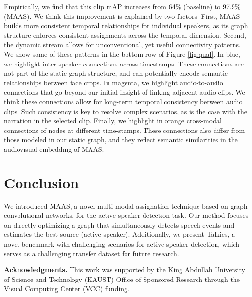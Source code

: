 \documentclass[10pt,twocolumn,letterpaper]{article}
\begin{document}
Empirically, we find that this clip mAP increases from 64\% (baseline) to 97.9\% (MAAS). We think this improvement is explained by two factors. First, MAAS builds more consistent temporal relationships for individual speakers, as its graph structure enforces consistent assignments across the temporal dimension. Second, the dynamic stream allows for unconventional, yet useful connectivity patterns. We show some of these patterns in the bottom row of Figure  \ref{fig:qual}. In blue, we highlight inter-speaker connections across timestamps. These connections are not part of the static graph structure, and can potentially encode semantic relationships between face crops. In magenta, we highlight audio-to-audio connections that go beyond our initial insight of linking adjacent audio clips. We think these connections allow for long-term temporal consistency between audio clips. Such consistency is key to resolve complex scenarios, as is the case with the narration in the selected clip. Finally, we highlight in orange cross-modal connections of nodes at different time-stamps. These connections also differ from those modeled in our static graph, and they reflect semantic similarities in the audiovisual embedding of MAAS.
 

\section{Conclusion}
We introduced MAAS, a novel multi-modal assignation technique based on graph convolutional networks, for the active speaker detection task. Our method focuses on directly optimizing a graph that simultaneously detects speech events and estimates the best source (active speaker). Additionally, we present Talkies, a novel benchmark with challenging scenarios for active speaker detection, which serves as a challenging transfer dataset for future research.

\textbf{Acknowledgments.} This work was supported by the King Abdullah University of Science and Technology (KAUST) Office of Sponsored Research through the Visual Computing Center (VCC) funding.


{\small


}
\end{document}
